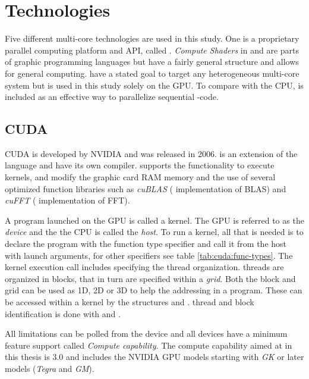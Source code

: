\chapter{Technologies}\label{cha:technologies}

\newcommand{\procwidth}{{\textwidth * 7 / 10}}

Five different multi-core technologies are used in this study. One is a proprietary parallel computing platform and \gls{API}, called {\CU}. \textit{Compute Shaders} in {\GL} and {\DX} are parts of graphic programming languages but have a fairly general structure and allows for general computing. {\OCL} have a stated goal to target any heterogeneous multi-core system but is used in this study solely on the \gls{GPU}. To compare with the \gls{CPU}, {\OMP} is included as an effective way to parallelize sequential {\CPP}-code.

\section{CUDA}

\gls{CUDA} is developed by NVIDIA and was released in 2006. {\CU} is an extension of the {\CPP} language and have its own compiler. {\CU} supports the functionality to execute kernels, and modify the graphic card RAM memory and the use of several optimized function libraries such as \textit{cuBLAS} ({\CU} implementation of \gls{BLAS}) and \textit{cuFFT} ({\CU} implementation of \gls{FFT}).


A program launched on the \gls{GPU} is called a \gls{kernel}. The \gls{GPU} is referred to as the \textit{device} and the the \gls{CPU} is called the \textit{host}. To run a {\CU} \gls{kernel}, all that is needed is to declare the program with the function type specifier  and call it from the host with launch arguments, for other specifiers see table \ref{tab:cuda:func-types}. The \gls{kernel} execution call includes specifying the \gls{thread} organization. \Glspl{thread} are organized in \glspl{block}, that in turn are specified within a \emph{grid}. Both the \gls{block} and grid can be used as \gls{1D}, \gls{2D} or \gls{3D} to help the addressing in a program. These can be accessed within a \gls{kernel} by the structures  and . \Gls{thread} and \gls{block} identification is done with  and .

All limitations can be polled from the device and all devices have a minimum feature support called \emph{Compute capability}. The compute capability aimed at in this thesis is $3.0$ and includes the NVIDIA \gls{GPU} models starting with \emph{GK} or later models (\emph{Tegra} and \emph{GM}).


